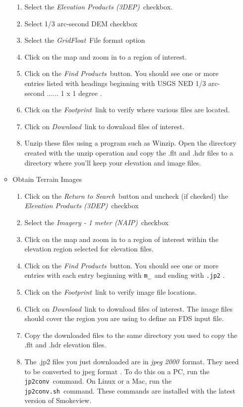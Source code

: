 \begin{itemize}
\begin{itemize}
\begin{enumerate}
\item Select the {\em Elevation Products (3DEP)}\ checkbox.
\item Select 1/3 arc-second DEM checkbox
\item Select the {\em GridFloat}\ File format option
\item Click on the map and zoom in to a region of interest.
\item Click on the {\em Find Products}\ button.  You should see one or more
entries listed with headings beginning with
USGS NED 1/3 arc-second ...... 1 x 1 degree .
\item Click on the {\em Footprint}\ link to verify where various files are located.
\item Click on {\em Download}\ link to download files of interest.
\item Unzip these files using a program such as Winzip. Open the directory created with the unzip operation and
copy the .flt and .hdr files to a directory where you'll keep your elevation and image files.
\end{enumerate}

\item Obtain Terrain Images
\begin{enumerate}
\item Click on the {\em Return to Search}\ button
and uncheck (if checked) the {\em Elevation Products (3DEP)}\ checkbox
\item Select the {\em Imagery - 1 meter (NAIP)}\ checkbox
\item Click on the map and zoom in to
a region of interest within the elevation region selected for elevation files.
\item Click on the {\em Find Products}\ button.  You should see one or more
entries with each entry beginning with {\tt m\_}\ and ending with {\tt .jp2} .
\item Click on the {\em Footprint}\ link to verify image file locations.
\item Click on {\em Download}\ link to download files of interest. The image files should
cover the region you are using to define an FDS input file.
\item Copy the downloaded files to the same directory you used to copy the .flt and .hdr elevation files.
\item The .jp2 files you just downloaded are in {\em jpeg 2000}\ format.
They need to be converted to jpeg format .
To do this on a PC, run the {\tt jp2conv}\ command.
On Linux or a Mac, run the {\tt jp2conv.sh}\ command.
These commands are installed with the latest version of Smokeview.
\end{enumerate}
\end{itemize}
\end{itemize}

